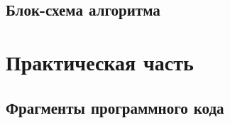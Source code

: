 \documentclass[12pt,a4paper,oneside]{article} %
\begin{document}
\newpage
\subsection{Блок-схема алгоритма}

\begin{figure}[h!]
\end{figure}
\newpage
\section{Практическая часть}
\subsection{Фрагменты программного кода}
\end{document}
